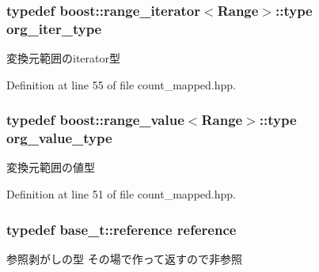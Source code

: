 \hypertarget{classyuh_1_1range__detail_1_1count__map__iterator_a7d85ad9a5f85d7a869dd7ea9557eee8b}{
\subsubsection[{org\-\_\-iter\-\_\-type}]{\setlength{\rightskip}{0pt plus 5cm}typedef boost\-::range\-\_\-iterator$<$\-Range$>$\-::type {\bf org\-\_\-iter\-\_\-type}}}\label{d1/def/classyuh_1_1range__detail_1_1count__map__iterator_a7d85ad9a5f85d7a869dd7ea9557eee8b}
変換元範囲のiterator型 

\-Definition at line 55 of file count\-\_\-mapped.\-hpp.

\hypertarget{classyuh_1_1range__detail_1_1count__map__iterator_a69559cacbf423e64c6efb8e1644ea37e}{
\subsubsection[{org\-\_\-value\-\_\-type}]{\setlength{\rightskip}{0pt plus 5cm}typedef boost\-::range\-\_\-value$<$\-Range$>$\-::type {\bf org\-\_\-value\-\_\-type}}}\label{d1/def/classyuh_1_1range__detail_1_1count__map__iterator_a69559cacbf423e64c6efb8e1644ea37e}
変換元範囲の値型 

\-Definition at line 51 of file count\-\_\-mapped.\-hpp.

\hypertarget{classyuh_1_1range__detail_1_1count__map__iterator_aa5d67140d1557795cc6c30a2849d4e05}{
\subsubsection[{reference}]{\setlength{\rightskip}{0pt plus 5cm}typedef base\-\_\-t\-::reference {\bf reference}}}\label{d1/def/classyuh_1_1range__detail_1_1count__map__iterator_aa5d67140d1557795cc6c30a2849d4e05}
参照剥がしの型 その場で作って返すので非参照 

